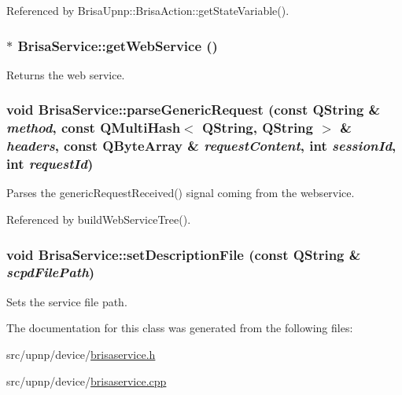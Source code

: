 Referenced by BrisaUpnp::BrisaAction::getStateVariable().\hypertarget{classBrisaUpnp_1_1BrisaService_a77c97c9c86a73401441b6d8a5749ce58}{
\subsubsection[{getWebService}]{ $\ast$ BrisaService::getWebService ()}}
\label{classBrisaUpnp_1_1BrisaService_a77c97c9c86a73401441b6d8a5749ce58}


Returns the web service. \hypertarget{classBrisaUpnp_1_1BrisaService_a8c9ff2ebfd688a97c86139eefd706edc}{
\subsubsection[{parseGenericRequest}]{\setlength{\rightskip}{0pt plus 5cm}void BrisaService::parseGenericRequest (const QString \& {\em method}, \/  const QMultiHash$<$ QString, QString $>$ \& {\em headers}, \/  const QByteArray \& {\em requestContent}, \/  int {\em sessionId}, \/  int {\em requestId})}}
\label{classBrisaUpnp_1_1BrisaService_a8c9ff2ebfd688a97c86139eefd706edc}


Parses the genericRequestReceived() signal coming from the webservice. 

Referenced by buildWebServiceTree().\hypertarget{classBrisaUpnp_1_1BrisaService_ad9e2b0c98932f656aee0c4f020955f97}{
\subsubsection[{setDescriptionFile}]{\setlength{\rightskip}{0pt plus 5cm}void BrisaService::setDescriptionFile (const QString \& {\em scpdFilePath})}}
\label{classBrisaUpnp_1_1BrisaService_ad9e2b0c98932f656aee0c4f020955f97}


Sets the service file path. 

The documentation for this class was generated from the following files:\begin{DoxyCompactItemize}
\item 
src/upnp/device/\hyperlink{brisaservice_8h}{brisaservice.h}\item 
src/upnp/device/\hyperlink{brisaservice_8cpp}{brisaservice.cpp}\end{DoxyCompactItemize}
